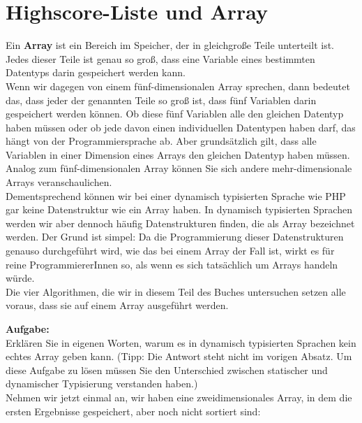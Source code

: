 \section{Highscore-Liste und Array}

Ein \textbf{Array} ist ein Bereich im Speicher, der in gleichgroße Teile unterteilt ist. Jedes dieser Teile ist genau so groß, dass eine Variable eines bestimmten Datentyps darin gespeichert werden kann.\\

Wenn wir dagegen von einem fünf-dimensionalen Array sprechen, dann bedeutet das, dass jeder der genannten Teile so groß ist, dass fünf Variablen darin gespeichert werden können. Ob diese fünf Variablen alle den gleichen Datentyp haben müssen oder ob jede davon einen individuellen Datentypen haben darf, das hängt von der Programmiersprache ab. Aber grundsätzlich gilt, dass alle Variablen in einer Dimension eines Arrays den gleichen Datentyp haben müssen. Analog zum fünf-dimensionalen Array können Sie sich andere mehr-dimensionale Arrays veranschaulichen.\\

Dementsprechend können wir bei einer dynamisch typisierten Sprache wie PHP gar keine Datenstruktur wie ein Array haben. In dynamisch typisierten Sprachen werden wir aber dennoch häufig Datenstrukturen finden, die als Array bezeichnet werden. Der Grund ist simpel: Da die Programmierung dieser Datenstrukturen genauso durchgeführt wird, wie das bei einem Array der Fall ist, wirkt es für reine ProgrammiererInnen so, als wenn es sich tatsächlich um Arrays handeln würde.\\

Die vier Algorithmen, die wir in diesem Teil des Buches untersuchen setzen alle voraus, dass sie auf einem Array ausgeführt werden.

\textbf{Aufgabe:}\\

Erklären Sie in eigenen Worten, warum es in dynamisch typisierten Sprachen kein \glqq{}echtes\grqq{} Array geben kann. (Tipp: Die Antwort steht nicht im vorigen Absatz. Um diese Aufgabe zu lösen müssen Sie den Unterschied zwischen statischer und dynamischer Typisierung verstanden haben.)\\

Nehmen wir jetzt einmal an, wir haben eine zweidimensionales Array, in dem die ersten Ergebnisse gespeichert, aber noch nicht sortiert sind:\\

